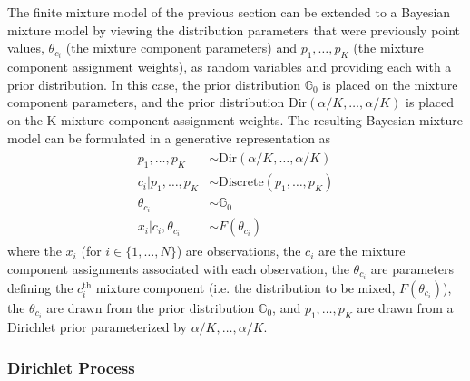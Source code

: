 \documentclass[smallcondensed, final]{svjour3}
\begin{document}
The finite mixture model of the previous section can be extended to a Bayesian mixture model by viewing the distribution parameters that were previously point values, $\theta_{c_{i}}$ (the mixture component parameters) and $p_{1}, \ldots, p_{K}$ (the mixture component assignment weights), as random variables and providing each with a prior distribution. In this case, the prior distribution $\mathbb{G}_{0}$ is placed on the mixture component parameters, and the prior distribution $\text{Dir}(\alpha/K, \ldots, \alpha/K)$ is placed on the K mixture component assignment weights. The resulting Bayesian mixture model can be formulated in a generative representation as
\begin{align}
\begin{split}
\label{bayesian_mixture_model}
	p_{1}, \ldots, p_{K}  &\sim  \text{Dir}(\alpha/K, \ldots, \alpha/K)\\
	c_{i}|p_{1}, \ldots, p_{K}  &\sim  \text{Discrete}(p_{1}, \ldots, p_{K}) \\
	\theta_{c_{i}}  &\sim  \mathbb{G}_{0} \\
	x_{i}|c_{i}, \theta_{c_{i}}  &\sim  F(\theta_{c_{i}})
\end{split}
\end{align}
where the $x_{i}$ (for $i \in \{ 1, \ldots, N \}$) are observations, the $c_{i}$ are the mixture component assignments associated with each observation, the $\theta_{c_{i}}$ are parameters defining the $c_{i}^{\text{th}}$ mixture component (i.e. the distribution to be mixed, $F(\theta_{c_{i}})$), the $\theta_{c_{i}}$ are drawn from the prior distribution $\mathbb{G}_{0}$, and $p_{1}, \ldots, p_{K}$ are drawn from a Dirichlet prior parameterized by $\alpha/K, \ldots, \alpha/K$.




\subsubsection{Dirichlet Process}

\end{document}
